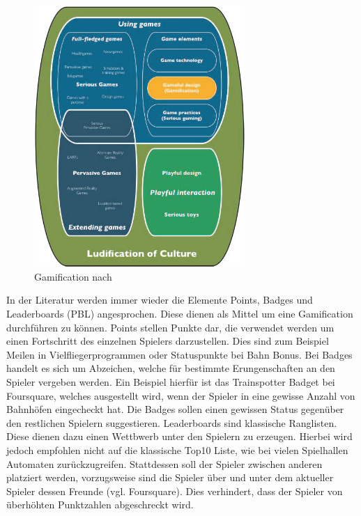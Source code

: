 \begin{figure}[H]
\begin{center}
\includegraphics[width=80mm]{images/ch3_img02_gamification.png}
\caption{Gamification nach \cite{Deterding.2011}}
\label{img:ch3_img02_gamification}
\end{center}
\end{figure}
%

In der Literatur werden immer wieder die Elemente Points, Badges und Leaderboards (PBL) angesprochen. Diese dienen als Mittel um eine Gamification durchführen zu können. 
Points stellen Punkte dar, die verwendet werden um einen Fortschritt des einzelnen Spielers darzustellen. Dies sind zum Beispiel Meilen in Vielfliegerprogrammen oder Statuspunkte bei Bahn Bonus.
Bei Badges handelt es sich um Abzeichen, welche für bestimmte Erungenschaften an den Spieler vergeben werden. Ein Beispiel hierfür ist das Trainspotter Badget bei Foursquare, welches ausgestellt wird, wenn der Spieler in eine gewisse Anzahl von Bahnhöfen eingecheckt hat. Die Badges sollen einen gewissen Status gegenüber den restlichen Spielern suggestieren.
Leaderboards sind klassische Ranglisten. Diese dienen dazu einen Wettbwerb unter den Spielern zu erzeugen. Hierbei wird jedoch empfohlen nicht auf die klassische Top10 Liste, wie bei vielen Spielhallen Automaten zurückzugreifen. Stattdessen soll der Spieler zwischen anderen platziert werden, vorzugsweise sind die Spieler über und unter dem aktueller Spieler dessen Freunde (vgl. Foursquare). Dies verhindert, dass der Spieler von überhöhten Punktzahlen abgeschreckt wird.

